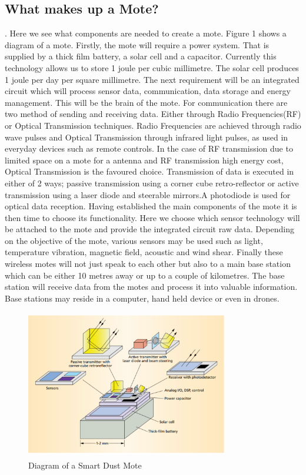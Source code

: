 \documentclass[article]{IEEEtran}
\begin{document}
\subsection*{What makes up a Mote?}.\newline
Here we see what components are needed to create a mote. 
Figure 1 shows a diagram of a mote. Firstly, the mote will require a power system. That is supplied by a thick film battery, a solar cell and a capacitor. Currently this technology allows us to store 1 joule per cubic millimetre. The solar cell produces 1 joule per day per square millimetre. 
The next requirement will be an integrated circuit which will process sensor data, communication, data storage and energy management. This will be the brain of the mote. 
For communication there are two method of sending and receiving data. Either through Radio Frequencies(RF) or Optical Transmission techniques. Radio Frequencies are achieved through radio wave pulses and Optical Transmission through infrared light pulses, as used in everyday devices such as remote controls. In the case of RF transmission due to limited space on a mote for a antenna and RF transmission high energy cost, Optical Transmission is the favoured choice. Transmission of data is executed in either of 2 ways; passive transmission using a corner cube retro-reflector or active transmission using a laser diode and steerable mirrors.A photodiode is used for optical data reception.
Having established the main components of the mote it is then time to choose its functionality. Here we choose which sensor technology will be attached to the mote and provide the integrated circuit raw data. Depending on the objective of the mote, various sensors may be used such as light, temperature vibration, magnetic field, acoustic and wind shear.
Finally these wireless motes will not just speak to each other but also to a main base station which can be either 10 metres away or up to a couple of kilometres.  The base station will receive data from the motes and process it into valuable information. Base stations may reside in a computer, hand held device or even in drones\cite{Mili}.

\begin{figure}[h!]
\graphicspath{ {images/} }
\includegraphics[width=8.8cm, height=6.5cm]{figure1}
\caption{Diagram of a Smart Dust Mote\cite{Mili}}
\end{figure}
\end{document}
